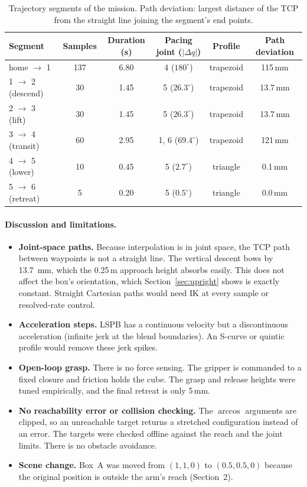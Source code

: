 \documentclass[11pt,a4paper]{article}
\begin{document}
\begin{table}[h]
\centering\small
\begin{tabular}{lccccc}
\toprule
Segment & Samples & Duration (s) & Pacing joint (\(|\Delta q|\)) & Profile & Path deviation \\
\midrule
home \(\to\) 1 & 137 & 6.80 & 4 (\(180^\circ\)) & trapezoid & 115\,mm \\
1 \(\to\) 2 (descend) & 30 & 1.45 & 5 (\(26.3^\circ\)) & trapezoid & 13.7\,mm \\
2 \(\to\) 3 (lift) & 30 & 1.45 & 5 (\(26.3^\circ\)) & trapezoid & 13.7\,mm \\
3 \(\to\) 4 (transit) & 60 & 2.95 & 1, 6 (\(69.4^\circ\)) & trapezoid & 121\,mm \\
4 \(\to\) 5 (lower) & 10 & 0.45 & 5 (\(2.7^\circ\)) & triangle & 0.1\,mm \\
5 \(\to\) 6 (retreat) & 5 & 0.20 & 5 (\(0.5^\circ\)) & triangle & 0.0\,mm \\
\bottomrule
\end{tabular}
\caption{Trajectory segments of the mission. Path deviation: largest distance of the TCP from the straight line joining the segment's end points.}
\label{tab:segments}
\end{table}

\paragraph{Discussion and limitations.}
\begin{itemize}
\item \textbf{Joint-space paths.} Because interpolation is in joint space, the TCP path
between waypoints is not a straight line. The vertical descent bows by
\SI{13.7}{mm}, which the 0.25\,m approach height absorbs easily. This does not affect
the box's orientation, which Section~\ref{sec:upright} shows is exactly constant.
Straight Cartesian paths would need IK at every sample or resolved-rate control.
\item \textbf{Acceleration steps.} LSPB has a continuous velocity but a discontinuous
acceleration (infinite jerk at the blend boundaries). An S-curve or quintic profile would
remove these jerk spikes.
\item \textbf{Open-loop grasp.} There is no force sensing. The gripper is commanded to a
fixed closure and friction holds the cube. The grasp and release heights were tuned
empirically, and the final retreat is only 5\,mm.
\item \textbf{No reachability error or collision checking.} The \(\arccos\) arguments are
clipped, so an unreachable target returns a stretched configuration instead of an error.
The targets were checked offline against the reach and the joint limits. There is no
obstacle avoidance.
\item \textbf{Scene change.} Box~A was moved from \((1,1,0)\) to \((0.5,0.5,0)\) because
the original position is outside the arm's reach (Section~2).
\end{itemize}
\end{document}
